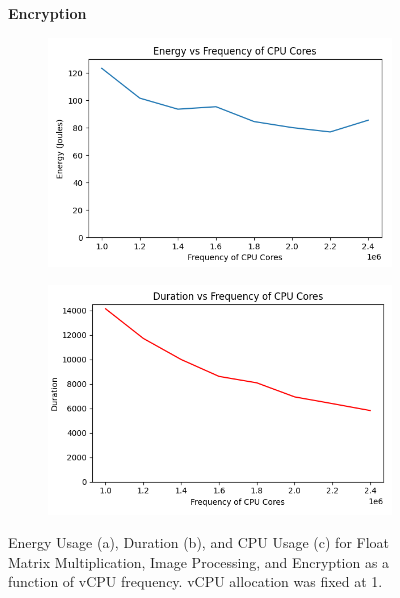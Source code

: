 \documentclass[times, 10pt,twocolumn]{article}
\begin{document}
\begin{figure}[ht]
   \textbf{Encryption}\par\medskip
   \begin{subfigure}[b]{0.45\textwidth}
      \includegraphics[width=\textwidth]{imgs/study_1_results/var_freq/encryption/Freq_Energy.png}
     \caption{}
     \label{fig:plot14}
   \end{subfigure}
   \hfill
   \begin{subfigure}[b]{0.45\textwidth}
      \includegraphics[width=\textwidth]{imgs/study_1_results/var_freq/encryption/Freq_Duration.png}
     \caption{}
     \label{fig:plot15}
   \end{subfigure}
   
   \caption{Energy Usage (a), Duration (b), and CPU Usage (c) for Float Matrix Multiplication, Image Processing, and Encryption as a function of vCPU frequency. vCPU allocation was fixed at 1.}
   \label{fig:freq_stats}
 \end{figure}
 
\end{document}
